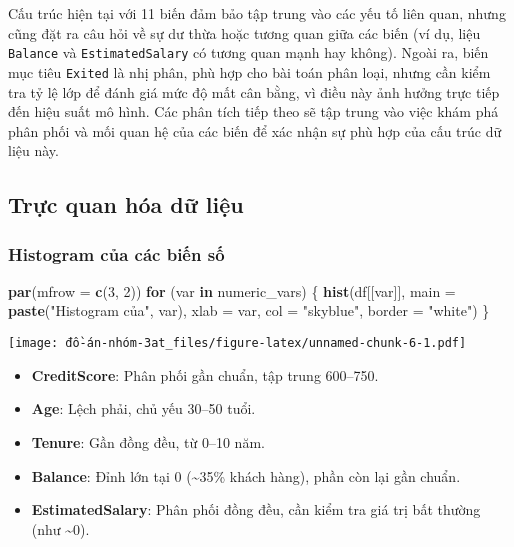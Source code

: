 \documentclass[
]{article}
\newenvironment{Shaded}{\begin{snugshade}}{\end{snugshade}}
\newcommand{\AttributeTok}[1]{\textcolor[rgb]{0.13,0.29,0.53}{#1}}
\newcommand{\ControlFlowTok}[1]{\textcolor[rgb]{0.13,0.29,0.53}{\textbf{#1}}}
\newcommand{\DecValTok}[1]{\textcolor[rgb]{0.00,0.00,0.81}{#1}}
\newcommand{\FunctionTok}[1]{\textcolor[rgb]{0.13,0.29,0.53}{\textbf{#1}}}
\newcommand{\NormalTok}[1]{#1}
\newcommand{\StringTok}[1]{\textcolor[rgb]{0.31,0.60,0.02}{#1}}
\providecommand{\tightlist}{%
  \setlength{\itemsep}{0pt}\setlength{\parskip}{0pt}}
\begin{document}
Cấu trúc hiện tại với 11 biến đảm bảo tập trung vào các yếu tố liên
quan, nhưng cũng đặt ra câu hỏi về sự dư thừa hoặc tương quan giữa các
biến (ví dụ, liệu \texttt{Balance} và \texttt{EstimatedSalary} có tương
quan mạnh hay không). Ngoài ra, biến mục tiêu \texttt{Exited} là nhị
phân, phù hợp cho bài toán phân loại, nhưng cần kiểm tra tỷ lệ lớp để
đánh giá mức độ mất cân bằng, vì điều này ảnh hưởng trực tiếp đến hiệu
suất mô hình. Các phân tích tiếp theo sẽ tập trung vào việc khám phá
phân phối và mối quan hệ của các biến để xác nhận sự phù hợp của cấu
trúc dữ liệu này.

\subsection{Trực quan hóa dữ liệu}\label{sec-visualization}

\subsubsection{Histogram của các biến số}\label{sec-histogram}

\begin{Shaded}
\begin{Highlighting}[]
\FunctionTok{par}\NormalTok{(}\AttributeTok{mfrow =} \FunctionTok{c}\NormalTok{(}\DecValTok{3}\NormalTok{, }\DecValTok{2}\NormalTok{))}
\ControlFlowTok{for}\NormalTok{ (var }\ControlFlowTok{in}\NormalTok{ numeric\_vars) \{}
  \FunctionTok{hist}\NormalTok{(df[[var]], }\AttributeTok{main =} \FunctionTok{paste}\NormalTok{(}\StringTok{"Histogram của"}\NormalTok{, var), }\AttributeTok{xlab =}\NormalTok{ var, }\AttributeTok{col =} \StringTok{"skyblue"}\NormalTok{, }\AttributeTok{border =} \StringTok{"white"}\NormalTok{)}
\NormalTok{\}}
\end{Highlighting}
\end{Shaded}

\texttt{[image: đồ-án-nhóm-3at\_files/figure-latex/unnamed-chunk-6-1.pdf]}

\begin{itemize}
\tightlist
\item
  \textbf{CreditScore}: Phân phối gần chuẩn, tập trung 600--750.
\item
  \textbf{Age}: Lệch phải, chủ yếu 30--50 tuổi.
\item
  \textbf{Tenure}: Gần đồng đều, từ 0--10 năm.
\item
  \textbf{Balance}: Đỉnh lớn tại 0 (\textasciitilde35\% khách hàng),
  phần còn lại gần chuẩn.
\item
  \textbf{EstimatedSalary}: Phân phối đồng đều, cần kiểm tra giá trị bất
  thường (như \textasciitilde0).
\end{itemize}
\end{document}
